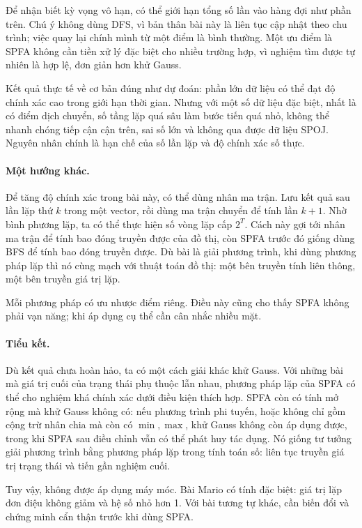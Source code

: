 \documentclass[11pt]{article}
\begin{document}
Để nhận biết kỳ vọng vô hạn, có thể giới hạn tổng số lần vào hàng đợi như
phần trên. Chú ý không dùng DFS, vì bản thân bài này là liên tục cập nhật
theo chu trình; việc quay lại chính mình từ một điểm là bình thường. Một ưu
điểm là SPFA không cần tiền xử lý đặc biệt cho nhiều trường hợp, vì nghiệm tìm
được tự nhiên là hợp lệ, đơn giản hơn khử Gauss.

Kết quả thực tế về cơ bản đúng như dự đoán: phần lớn dữ liệu có thể đạt độ
chính xác cao trong giới hạn thời gian. Nhưng với một số dữ liệu đặc biệt,
nhất là có điểm dịch chuyển, số tầng lặp quá sâu làm bước tiến quá nhỏ, không
thể nhanh chóng tiếp cận cận trên, sai số lớn và không qua được dữ liệu SPOJ.
Nguyên nhân chính là hạn chế của số lần lặp và độ chính xác số thực.

\paragraph{Một hướng khác.}
Để tăng độ chính xác trong bài này, có thể dùng nhân ma trận. Lưu kết quả sau
lần lặp thứ \(k\) trong một vector, rồi dùng ma trận chuyển để tính lần
\(k+1\). Nhờ bình phương lặp, ta có thể thực hiện số vòng lặp cấp \(2^T\).
Cách này gợi tới nhân ma trận để tính bao đóng truyền được của đồ thị, còn
SPFA trước đó giống dùng BFS để tính bao đóng truyền được. Dù bài là giải
phương trình, khi dùng phương pháp lặp thì nó cùng mạch với thuật toán đồ thị:
một bên truyền tính liên thông, một bên truyền giá trị lặp.

Mỗi phương pháp có ưu nhược điểm riêng. Điều này cũng cho thấy SPFA không phải
vạn năng; khi áp dụng cụ thể cần cân nhắc nhiều mặt.

\paragraph{Tiểu kết.}
Dù kết quả chưa hoàn hảo, ta có một cách giải khác khử Gauss. Với những bài
mà giá trị cuối của trạng thái phụ thuộc lẫn nhau, phương pháp lặp của SPFA
có thể cho nghiệm khá chính xác dưới điều kiện thích hợp. SPFA còn có tính mở
rộng mà khử Gauss không có: nếu phương trình phi tuyến, hoặc không chỉ gồm
cộng trừ nhân chia mà còn có \(\min,\max\), khử Gauss không còn áp dụng được,
trong khi SPFA sau điều chỉnh vẫn có thể phát huy tác dụng. Nó giống tư tưởng
giải phương trình bằng phương pháp lặp trong tính toán số: liên tục truyền
giá trị trạng thái và tiến gần nghiệm cuối.

Tuy vậy, không được áp dụng máy móc. Bài Mario có tính đặc biệt: giá trị lặp
đơn điệu không giảm và hệ số nhỏ hơn 1. Với bài tương tự khác, cần biến đổi
và chứng minh cẩn thận trước khi dùng SPFA.
\end{document}
